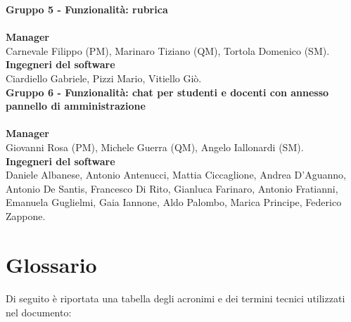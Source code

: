 \textbf {Gruppo 5 - Funzionalità: rubrica} \\ \\
\textbf{Manager} \\
Carnevale Filippo (PM), Marinaro Tiziano (QM), Tortola Domenico (SM). \\
\textbf{Ingegneri del software} \\
Ciardiello Gabriele, Pizzi Mario, Vitiello Giò. \\

\textbf{Gruppo 6 - Funzionalità: chat per studenti e docenti con annesso pannello di amministrazione} \\ \\
\textbf{Manager} \\
\textbf{} 
Giovanni Rosa (PM), Michele Guerra (QM), Angelo Iallonardi (SM). \\
\textbf{Ingegneri del software } \\
Daniele Albanese, Antonio Antenucci, Mattia Ciccaglione, Andrea D'Aguanno, Antonio De Santis,  Francesco Di Rito, Gianluca Farinaro, Antonio Fratianni, Emanuela Guglielmi, Gaia Iannone, Aldo Palombo, Marica Principe, Federico Zappone.

\clearpage
\section{Glossario}

\paragraph{}
Di seguito è riportata una tabella degli acronimi e dei termini tecnici utilizzati nel documento:

